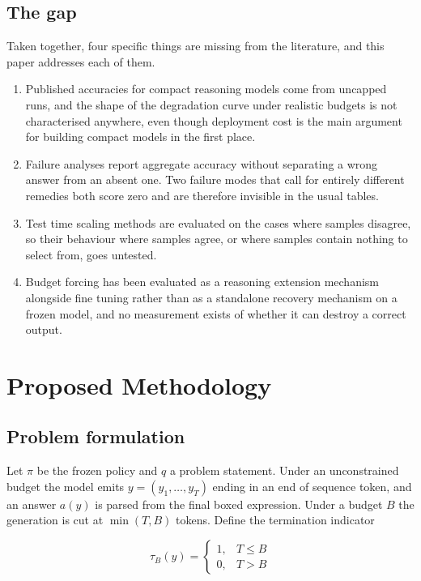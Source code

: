 \documentclass[conference]{IEEEtran}
\begin{document}
\subsection{The gap}

Taken together, four specific things are missing from the literature, and this
paper addresses each of them.

\begin{enumerate}
\item Published accuracies for compact reasoning models come from uncapped runs,
and the shape of the degradation curve under realistic budgets is not
characterised anywhere, even though deployment cost is the main argument for
building compact models in the first place.
\item Failure analyses report aggregate accuracy without separating a wrong
answer from an absent one. Two failure modes that call for entirely different
remedies both score zero and are therefore invisible in the usual tables.
\item Test time scaling methods are evaluated on the cases where samples
disagree, so their behaviour where samples agree, or where samples contain
nothing to select from, goes untested.
\item Budget forcing has been evaluated as a reasoning extension mechanism
alongside fine tuning rather than as a standalone recovery mechanism on a frozen
model, and no measurement exists of whether it can destroy a correct output.
\end{enumerate}

\section{Proposed Methodology}

\subsection{Problem formulation}

Let $\pi$ be the frozen policy and $q$ a problem statement. Under an unconstrained
budget the model emits $y = (y_1,\dots,y_T)$ ending in an end of sequence token,
and an answer $a(y)$ is parsed from the final boxed expression. Under a budget $B$
the generation is cut at $\min(T,B)$ tokens. Define the termination indicator

\begin{equation}
\tau_B(y) =
\begin{cases}
1, & T \le B \\
0, & T > B
\end{cases}
\label{eq:tau}
\end{equation}
\end{document}
